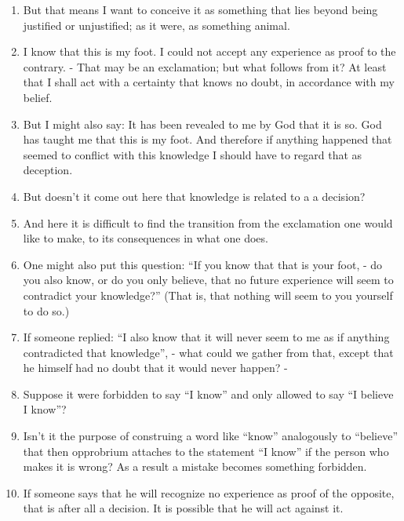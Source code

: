 \documentclass{book}
\begin{document}
\begin{enumerate}
\item
But that means I want to conceive it as something that lies beyond being
justified or unjustified; as it were, as something animal.

\item
I know that this is my foot. I could not accept any experience as proof to the
contrary. - That may be an exclamation; but what follows from it? At least that
I shall act with a certainty that knows no doubt, in accordance with my belief.

\item
But I might also say: It has been revealed to me by God that it is so. God has
taught me that this is my foot. And therefore if anything happened that seemed
to conflict with this knowledge I should have to regard that as deception.

\item
But doesn't it come out here that knowledge is related to a a decision?

\item
And here it is difficult to find the transition from the exclamation one would
like to make, to its consequences in what one does.

\item
One might also put this question: ``If you know that that is your foot, - do
you also know, or do you only believe, that no future experience will seem to
contradict your knowledge?'' (That is, that nothing will seem to you yourself
to do so.)

\item
If someone replied: ``I also know that it will never seem to me as if anything
contradicted that knowledge'', - what could we gather from that, except that he
himself had no doubt that it would never happen? -

\item
Suppose it were forbidden to say ``I know'' and only allowed to say ``I believe
I know''?

\item
Isn't it the purpose of construing a word like ``know'' analogously to
``believe'' that then opprobrium attaches to the statement ``I know'' if the
person who makes it is wrong?  As a result a mistake becomes something
forbidden.

\item
If someone says that he will recognize no experience as proof of the opposite,
that is after all a decision. It is possible that he will act against it.


\end{enumerate}
\end{document}
